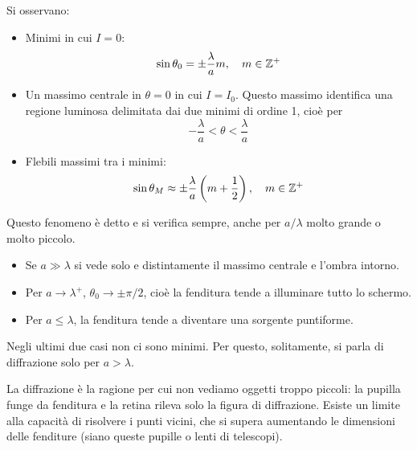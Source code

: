 Si osservano:
\begin{itemize}
    \item Minimi in cui $I = 0$:
        \begin{equation}
            \sin \theta_0 = \pm \frac{\lambda}{a} m, \quad
            m \in \mathbb{Z}^+
        \end{equation}
    \item Un massimo centrale in $\theta = 0$ in cui $I = I_0$.
    Questo massimo identifica una regione luminosa delimitata dai due minimi di ordine 1, cioè per
        \begin{equation}
            -\frac{\lambda}{a} < \theta < \frac{\lambda}{a}
        \end{equation}
    \item Flebili massimi tra i minimi:
        \begin{equation}
            \sin \theta_M \approx \pm \frac{\lambda}{a} \left( m + \frac{1}{2} \right), \quad
            m \in \mathbb{Z}^+
        \end{equation}
\end{itemize}


Questo fenomeno è detto  e si verifica sempre, anche per $a / \lambda$ molto grande o molto piccolo.
\begin{itemize}
    \item Se $a \gg \lambda$ si vede solo e distintamente il massimo centrale e l'ombra intorno.
    \item Per $a \to \lambda^+$, $\theta_0 \to \pm \pi/2$, cioè la fenditura tende a illuminare tutto lo schermo.
    \item Per $a \le \lambda$, la fenditura tende a diventare una sorgente puntiforme.
\end{itemize}
Negli ultimi due casi non ci sono minimi.
Per questo, solitamente, si parla di diffrazione solo per $a > \lambda$.

La diffrazione è la ragione per cui non vediamo oggetti troppo piccoli: la pupilla funge da fenditura e la retina rileva solo la figura di diffrazione.
Esiste un limite alla capacità di risolvere i punti vicini, che si supera aumentando le dimensioni delle fenditure (siano queste pupille o lenti di telescopi).
